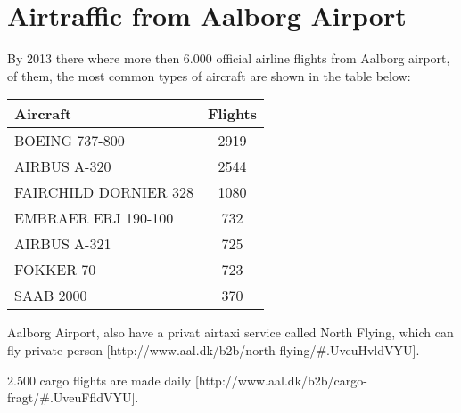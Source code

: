 \section{Airtraffic from Aalborg Airport}

By 2013 there where more then 6.000 official airline flights from Aalborg airport, of them, the most common types of aircraft are shown in the table below:

\begin{center}
    \begin{tabular}{ | l | c | }
        \hline
        Aircraft & Flights\\ \hline
        BOEING 737-800 & 2919\\ \hline
        AIRBUS A-320 & 2544\\ \hline
        FAIRCHILD DORNIER 328 & 1080\\ \hline
        EMBRAER ERJ 190-100 & 732\\ \hline
        AIRBUS A-321 & 725\\ \hline
        FOKKER 70 & 723\\ \hline
        SAAB 2000 & 370\\ \hline
    \end{tabular}
\end{center}


Aalborg Airport, also have a privat airtaxi service called North Flying, which can fly private person [http://www.aal.dk/b2b/north-flying/\#.UveuHvldVYU].

2.500 cargo flights are made daily [http://www.aal.dk/b2b/cargo-fragt/\#.UveuFfldVYU].


